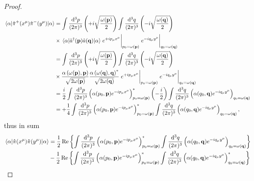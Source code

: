 \begin{proof}
\begin{equation*}
\begin{split}
			\expval{\hat\pi^+(x^\mu)\hat\pi^-(y^\mu)}{\alpha}
			&=
			\int\frac{\dd[3]{p}}{(2\pi)^3}
			\left(
				+i
				\sqrt{\frac{\omega(\vb{p})}{2}}
			\right)
			\int\frac{\dd[3]{q}}{(2\pi)^3}
			\left(
				-i
				\sqrt{\frac{\omega(\vb{q})}{2}}
			\right)
			\\
			&\times
			\expval{\hat{a}^\dagger(\vb{p})\hat{a}(\vb{q})}{\alpha}
			\eval{e^{+ip_\mu x^\mu}}_{p_0=\omega(\vb{p})}
			\eval{e^{-iq_\mu y^\mu}}_{q_0=\omega(\vb{q})}
			\\
			&=
			\int\frac{\dd[3]{p}}{(2\pi)^3}
			\left(
				+i
				\sqrt{\frac{\omega(\vb{p})}{2}}
			\right)
			\int\frac{\dd[3]{q}}{(2\pi)^3}
			\left(
				-i
				\sqrt{\frac{\omega(\vb{q})}{2}}
			\right)
			\\
			&\times
			\frac{\alpha\left(\omega(\vb{p}),\vb{p}\right)}{\sqrt{2\omega(\vb{p})}}
			\frac{\alpha\left(\omega(\vb{q}),\vb{q}\right)^*}{\sqrt{2\omega(\vb{q})}}
			\eval{e^{+ip_\mu x^\mu}}_{p_0=\omega(\vb{p})}
			\eval{e^{-iq_\mu y^\mu}}_{q_0=\omega(\vb{q})}
			\\
			&=
			\frac{i}{2}
			\int\frac{\dd[3]{p}}{(2\pi)^3}
			\left(
				\alpha(p_0,\vb{p})
				e^{-ip_\mu x^\mu}
			\right)^*_{p_0=\omega(\vb{p})}
			\left(
				-
				\frac{i}{2}
			\right)
			\int\frac{\dd[3]{q}}{(2\pi)^3}
			\left(
				\alpha(q_0,\vb{q})
				e^{-iq_\mu y^\mu}
			\right)_{q_0=\omega(\vb{q})}
			\\
			&=
			+
			\frac{1}{4}
			\int\frac{\dd[3]{p}}{(2\pi)^3}
			\left(
				\alpha(p_0,\vb{p})
				e^{-ip_\mu x^\mu}
			\right)^*_{p_0=\omega(\vb{p})}
			\int\frac{\dd[3]{q}}{(2\pi)^3}
			\left(
				\alpha(q_0,\vb{q})
				e^{-iq_\mu y^\mu}
			\right)_{q_0=\omega(\vb{q})}
			,
		\end{split}
	\end{equation*}
	thus in sum
	\begin{equation*}
		\begin{split}
			\expval{\hat\pi(x^\mu)\hat\pi(y^\mu)}{\alpha}
			&=
			\frac{1}{2}
			\operatorname{\operatorname{Re}}\left\{
				\int\frac{\dd[3]{p}}{(2\pi)^3}
				\left(
					\alpha(p_0,\vb{p})
					e^{-ip_\mu x^\mu}
				\right)^*_{p_0=\omega(\vb{p})}
				\int\frac{\dd[3]{q}}{(2\pi)^3}
				\left(
					\alpha(q_0,\vb{q})
					e^{-iq_\mu y^\mu}
				\right)_{q_0=\omega(\vb{q})}			
			\right\}
			\\
			&-
			\frac{1}{2}
			\operatorname{\operatorname{Re}}\left\{
				\int\frac{\dd[3]{p}}{(2\pi)^3}
				\left(
					\alpha(p_0,\vb{p})
					e^{-ip_\mu x^\mu}
				\right)^*_{p_0=\omega(\vb{p})}
				\int\frac{\dd[3]{q}}{(2\pi)^3}
				\left(
					\alpha(q_0,\vb{q})
					e^{-iq_\mu y^\mu}
				\right)^*_{q_0=\omega(\vb{q})}
			\right\}
		\end{split}
	\end{equation*}
\end{proof}
